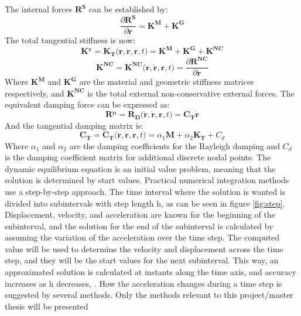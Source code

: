 \noindent The internal forces $\boldsymbol{R^S}$ can be established by:
\begin{equation}
    \frac{\partial \boldsymbol{R^S} }{\partial\boldsymbol{r}}= \boldsymbol{K^M}+\boldsymbol{K^G}
\end{equation}
\noindent The total tangential stiffness is now:
\begin{equation}
    \boldsymbol{K^_T}=\boldsymbol{K_T(\ddot{r},\dot{r},r},t)=\boldsymbol{K^M}+\boldsymbol{K^G}+\boldsymbol{K^{NC}}
\end{equation}
\begin{equation}
    \boldsymbol{K^{NC}}=\boldsymbol{K^{NC}(\ddot{r},\dot{r},r},t)=  \frac{\partial \boldsymbol{R^{NC}} }{\partial\boldsymbol{r}}
\end{equation}
\noindent Where $\boldsymbol{K^M}$ and $\boldsymbol{K^G}$ are the material and geometric stiffness matrices respectively, and $\boldsymbol{K^{NC}}$ is the total external non-conservative external forces. \newline
\newline
The equivalent damping force can be expressed as:
\begin{equation}
    \boldsymbol{R^_D}=\boldsymbol{R_D(\ddot{r},\dot{r},r},t)=  \boldsymbol{C_T}\boldsymbol{\dot{r}}
\end{equation}
And the tangential damping matrix is:
\begin{equation}
      \boldsymbol{C_{T}}=\boldsymbol{C_T(\ddot{r},\dot{r},r,}t)=\alpha_1 \boldsymbol{M}+\alpha_2\boldsymbol{K_T} + C_d 
\end{equation}
Where $\alpha_1$ and $\alpha_2$ are the damping coefficients for the Rayleigh damping and $C_d$ is the damping coefficient matrix for additional discrete nodal points.  
\noindent
\newline
\newline 
\noindent  The dynamic equilibrium equation is an initial value problem, meaning that the solution is determined by start values. Practical numerical integration methods use a step-by-step approach. The time interval where the solution is wanted is divided into subintervals with step length h, as can be seen in figure \ref{fig:step}. Displacement, velocity, and acceleration are known for the beginning of the subinterval, and the solution for the end of the subinterval is calculated by assuming the variation of the acceleration over the time step. The computed value will be used to determine the velocity and displacement across the time step, and they will be the start values for the next subinterval. This way, an approximated solution is calculated at instants along the time axis, and accuracy increases as h decreases, \cite{Langen1999}.
\newline 
\newline
 \noindent How the acceleration changes during a time step is suggested by several methods. Only the methods relevant to this project/master thesis will be presented\newline
 \newline
\noindent 
